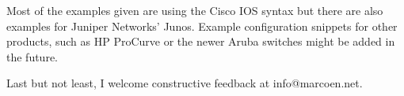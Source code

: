 Most of the examples given are using the Cisco IOS syntax but there are also examples for Juniper Networks' Junos.
Example configuration snippets for other products, such as HP ProCurve or the newer Aruba switches might be added in the future.

Last but not least, I welcome constructive feedback at info@\-marcoen.net.